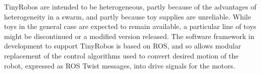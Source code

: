\documentclass[]{article}
\begin{document}
TinyRobos are intended to be heterogeneous, partly because of the advantages of heterogeneity in a swarm, and partly because toy supplies are unreliable.
While toys in the general case are expected to remain available, a particular line of toys might be discontinued or a modified version released. 
The software framework in development to support TinyRobos is based on ROS, and so allows modular replacement of the control algorithms used to convert desired motion of the robot, expressed as ROS Twist messages, into drive signals for the motors. 

\end{document}
